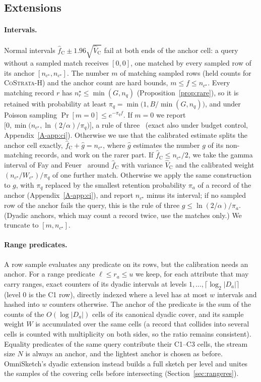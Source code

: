 \documentclass[sigconf]{acmart}
\newcommand{\csh}{\textsc{CoStrata-H}\xspace}
\newcommand{\omni}{OmniSketch\xspace}
\newcommand{\nstar}{n^{\star}}
\newcommand{\apx}[1]{Appendix~\ref{A-#1}}
\begin{document}
\subsection{Extensions}\label{sec:ext}

\paragraph{Intervals.}\label{sec:ci} Normal intervals $\hat f_{\mathrm C}\pm1.96\sqrt{\hat V_{\mathrm C}}$
fail at both ends of the anchor cell: a query without a sampled match receives $[0,0]$, one matched by
every sampled row of its anchor $[n_{c^\star},n_{c^\star}]$. The number $m$ of matching sampled rows (held
counts for \csh) and the anchor count are hard bounds, $m\le f\le n_{c^\star}$. Every matching record $r$
has $\nstar_r\le\min(G,n_q)$ (Proposition~\ref{prop:rare}), so it is retained with probability at least
$\pi_q=\min\bigl(1,B/\min(G,n_q)\bigr)$, and under Poisson sampling $\Pr[m=0]\le e^{-\pi_qf}$. If $m=0$ we
report $\bigl[0,\min\bigl(n_{c^\star},\ln(2/\alpha)/\pi_q\bigr)\bigr]$, a rule of three~\cite{ruleofthree}
(exact also under budget control, \apx{app:ci}).
Otherwise we use that the calibrated estimate splits the anchor cell exactly, $\hat f_{\mathrm C}+\hat
g=n_{c^\star}$, where $\hat g$ estimates the number $g$ of its non-matching records, and work on the rarer
part. If $\hat f_{\mathrm C}\le n_{c^\star}/2$, we take the gamma interval of Fay and
Feuer~\cite{fayfeuer} around $\hat f_{\mathrm C}$ with variance $\hat V_{\mathrm C}$ and the calibrated
weight $(n_{c^\star}/W_{c^\star})/\pi_q$ of one further match. Otherwise we apply the same construction to
$g$, with $\pi_q$ replaced by the smallest retention probability $\pi_a$ of a record of the anchor
(\apx{app:ci}), and report $n_{c^\star}$ minus its interval; if no sampled row of the anchor fails the
query, this is the rule of three $g\le\ln(2/\alpha)/\pi_a$. (Dyadic anchors, which may count a record
twice, use the matches only.) We truncate to $[m,n_{c^\star}]$.

\paragraph{Range predicates.}\label{sec:range} A row sample evaluates any predicate on its rows, but the
calibration needs an anchor. For a range predicate $\ell\le r_a\le u$ we keep, for each attribute that
may carry ranges, exact counters of its dyadic intervals at levels $1,\dots,\lceil\log_2|D_a|\rceil$
(level 0 is the C1 row), directly indexed where a level has at most $w$ intervals and hashed into $w$
counters otherwise. The anchor of the predicate is the sum of the counts of the $O(\log|D_a|)$ cells of
its canonical dyadic cover, and its sample weight $W$ is accumulated over the same cells (a record that
collides into several cells is counted with multiplicity on both sides, so the ratio remains consistent).
Equality predicates of the same query contribute their C1--C3 cells, the stream size $N$ is always an
anchor, and the lightest anchor is chosen as before. \omni's dyadic extension instead builds a full sketch
per level and unites the samples of the covering cells before intersecting (Section~\ref{sec:rangeres}).
\end{document}
